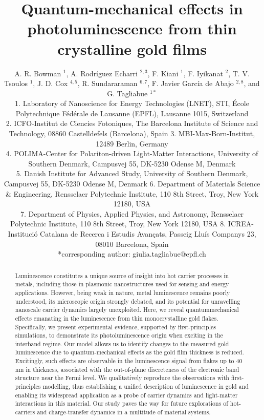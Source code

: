 \documentclass[10pt]{article}
\title{Quantum-mechanical effects in photoluminescence from thin crystalline gold films }
\author{A. R. Bowman ${ }^{1}$, A. Rodríguez Echarri ${ }^{2,3}$, F. Kiani ${ }^{1}$, F. Iyikanat ${ }^{2}$, T. V. Tsoulos ${ }^{1}$, J. D. Cox ${ }^{4,5}$, R. Sundararaman ${ }^{6,7}$, F. Javier García de Abajo ${ }^{2,8}$, and G. Tagliabue ${ }^{1 *}$\\
1. Laboratory of Nanoscience for Energy Technologies (LNET), STI, École Polytechnique Fédérale de Lausanne (EPFL), Lausanne 1015, Switzerland\\
2. ICFO-Institut de Ciencies Fotoniques, The Barcelona Institute of Science and Technology, 08860 Castelldefels (Barcelona), Spain 3. MBI-Max-Born-Institut, 12489 Berlin, Germany\\
4. POLIMA-Center for Polariton-driven Light-Matter Interactions, University of Southern Denmark, Campusvej 55, DK-5230 Odense M, Denmark\\
5. Danish Institute for Advanced Study, University of Southern Denmark, Campusvej 55, DK-5230 Odense M, Denmark 6. Department of Materials Science \& Engineering, Rensselaer Polytechnic Institute, 110 8th Street, Troy, New York 12180, USA\\
7. Department of Physics, Applied Physics, and Astronomy, Rensselaer Polytechnic Institute, 110 8th Street, Troy, New York 12180, USA 8. ICREA-Institució Catalana de Recerca i Estudis Avançats, Passeig Lluís Companys 23, 08010 Barcelona, Spain\\
*corresponding author: giulia.tagliabue@epfl.ch}
\date{}
\begin{document}
\maketitle
\captionsetup{singlelinecheck=false}


\begin{abstract}
Luminescence constitutes a unique source of insight into hot carrier processes in metals, including those in plasmonic nanostructures used for sensing and energy applications. However, being weak in nature, metal luminescence remains poorly understood, its microscopic origin strongly debated, and its potential for unravelling nanoscale carrier dynamics largely unexploited. Here, we reveal quantummechanical effects emanating in the luminescence from thin monocrystalline gold flakes. Specifically, we present experimental evidence, supported by first-principles simulations, to demonstrate its photoluminescence origin when exciting in the interband regime. Our model allows us to identify changes to the measured gold luminescence due to quantum-mechanical effects as the gold film thickness is reduced. Excitingly, such effects are observable in the luminescence signal from flakes up to 40 nm in thickness, associated with the out-of-plane discreteness of the electronic band structure near the Fermi level. We qualitatively reproduce the observations with first-principles modelling, thus establishing a unified description of luminescence in gold and enabling its widespread application as a probe of carrier dynamics and light-matter interactions in this material. Our study paves the way for future explorations of hot-carriers and charge-transfer dynamics in a multitude of material systems.
\end{abstract}
\end{document}
